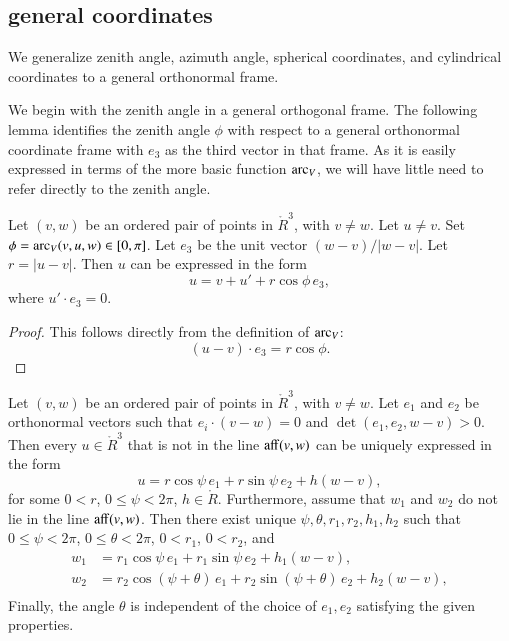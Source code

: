 \subsection{general coordinates}

We generalize zenith angle, azimuth angle,
spherical coordinates, and cylindrical coordinates 
to a general orthonormal frame.

We begin with the zenith angle in a general orthogonal frame.
The following lemma identifies the zenith angle $\phi$ with respect to
a general orthonormal coordinate frame with $e_3$ as the third
vector in that frame.  As it is easily expressed in terms
of the more basic function $\operatorname{arc}_V$, 
we will have little need to refer directly to the zenith angle.

\begin{lemma}[zenith]
Let $(v,w)$ be an ordered pair of points in $\ring{R}^3$, with $v\ne w$.
Let $u\ne v$.  Set $\phi = \operatorname{arc}_V(v,u,w)\in[0,\pi]$.
Let $e_3$ be the unit vector $(w-v)/|w-v|$.  Let $r = |u-v|$.
Then $u$
can be expressed in the form
   $$
   u = v + u' +
   r\cos\phi\, e_3,
   $$
where $u'\cdot e_3 = 0$.
\end{lemma}

\begin{proof} This follows directly from the definition of $\operatorname{arc}_V$:
  $$(u-v)\cdot e_3 = r\cos\phi.$$
\end{proof}



\begin{lemma}
Let $(v,w)$ be an ordered pair of points in
$\ring{R}^3$, with $v\ne w$.  Let $e_1$ and $e_2$ be orthonormal
vectors
such that $e_i\cdot (v-w)=0$ and $\det(e_1,e_2,w-v)>0$.  Then every
$u\in\ring{R}^3$ that is not in the line ${\operatorname{aff}}(v,w)$
can be uniquely expressed in the form
   $$
   u = r\cos\psi\, e_1 + r\sin\psi\, e_2 + h (w-v),
   $$
for some $0< r$, $0\le \psi < 2\pi$, $h\in\ring{R}$.
Furthermore,
assume that $w_1$ and $w_2$ do
not lie in the line ${\operatorname{aff}}(v,w)$.
Then there exist unique $\psi,\theta,r_1,r_2,h_1,h_2$
 such
that $0\le\psi<2\pi$, $0\le\theta < 2\pi$, $0 < r_1$, $0 < r_2$, and
  $$
  \begin{array}{lll}
    w_1 &= r_1\cos\psi\, e_1 + r_1\sin\psi\, e_2 + h_1(w-v),\\
    w_2 &=  r_2\cos(\psi+\theta)\, e_1 + r_2\sin(\psi+\theta)\, e_2 
     + h_2(w-v),\\
\end{array}
  $$
Finally, the angle $\theta$ is independent of the choice of $e_1,e_2$
satisfying the given properties.
\end{lemma}

